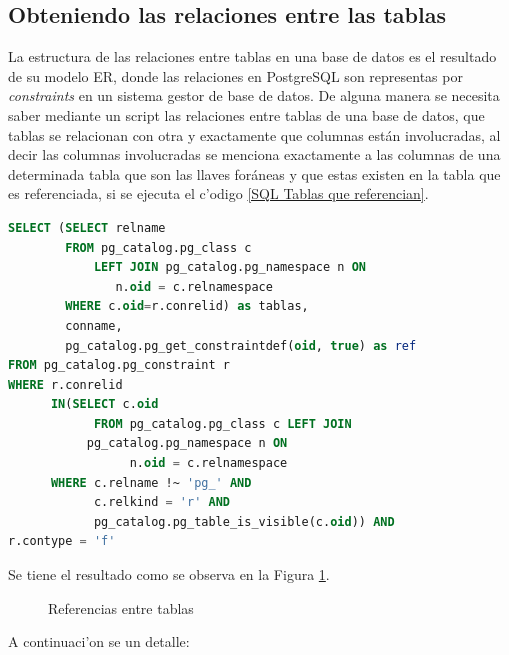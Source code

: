 \subsection{Obteniendo las relaciones entre las tablas}
La estructura de las relaciones entre tablas en una base de datos es el resultado de su modelo ER, donde las relaciones en PostgreSQL son representas por \textit{constraints} en un sistema gestor de base de datos.
De alguna manera se necesita saber mediante un script las relaciones entre tablas de una base de datos, que tablas se relacionan con otra y exactamente que columnas est\'an involucradas, al decir las columnas involucradas se menciona exactamente a las columnas de una determinada tabla que son las llaves for\'aneas y que estas existen en la tabla que es referenciada, si se ejecuta el c'odigo \ref{SQL Tablas que referencian}.
\begin{lstlisting}[caption={Query para obtener el detalle de referencias},label={SQL Tablas que referencian},language=sql]
SELECT (SELECT relname
        FROM pg_catalog.pg_class c
        	LEFT JOIN pg_catalog.pg_namespace n ON
		       n.oid = c.relnamespace
        WHERE c.oid=r.conrelid) as tablas,
        conname,
        pg_catalog.pg_get_constraintdef(oid, true) as ref 
FROM pg_catalog.pg_constraint r 
WHERE r.conrelid 
	  IN(SELECT c.oid 
		    FROM pg_catalog.pg_class c LEFT JOIN
           pg_catalog.pg_namespace n ON 
		         n.oid = c.relnamespace 
      WHERE c.relname !~ 'pg_' AND 
            c.relkind = 'r' AND 
            pg_catalog.pg_table_is_visible(c.oid)) AND 
r.contype = 'f'
\end{lstlisting}
 Se tiene el resultado como se observa en la Figura \ref{fig:Referencias entre tablas}.
\begin{figure}[H]
\centering
{}
\caption{Referencias entre tablas} \label{fig:Referencias entre tablas}
\end{figure}
A continuaci'on se un detalle:
